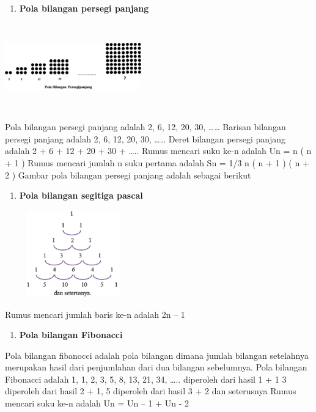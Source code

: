 \documentclass[11pt,fleqn]{book} %
\begin{document}
\noindent
\begin{enumerate}
	\item  \textbf{ Pola bilangan persegi panjang}
\end{enumerate}
\noindent
\begin{center}
	\noindent \includegraphics*[width=2.32in, height=1.48in, keepaspectratio=false, trim=0.00in 0.11in 0.00in 0.00in]{Pictures/25.PNG}
\end{center}
\noindent
\noindent  Pola bilangan persegi panjang adalah 2, 6, 12, 20, 30, ……
\noindent  Barisan bilangan persegi panjang adalah 2, 6, 12, 20, 30, ……
\noindent  Deret bilangan persegi panjang adalah 2 + 6 + 12 + 20 + 30 + …..
\noindent  Rumus mencari suku ke-n adalah Un = n ( n + 1 )
\noindent  Rumus mencari jumlah n suku pertama adalah Sn = 1/3 n ( n + 1 ) ( n + 2 )
\noindent  Gambar pola bilangan persegi panjang adalah sebagai berikut
\noindent
\begin{enumerate}
	\item  \textbf{ Pola bilangan segitiga pascal}
\end{enumerate}
\noindent
\begin{center}
	\noindent \includegraphics*[width=2.32in, height=1.48in, keepaspectratio=false, trim=0.00in 0.11in 0.00in 0.00in]{Pictures/26.PNG}
\end{center}
\noindent
\noindent Rumus mencari jumlah baris ke-n adalah 2n – 1
\noindent 
\noindent
\begin{enumerate}
	\item  \textbf{  Pola bilangan Fibonacci}
\end{enumerate}

\noindent Pola bilangan fibanocci adalah pola bilangan dimana jumlah bilangan setelahnya merupakan hasil dari penjumlahan dari dua bilangan sebelumnya.
\noindent  Pola bilangan Fibonacci adalah 1, 1, 2, 3, 5, 8, 13, 21, 34, …..
 diperoleh dari hasil 1 + 1 3 diperoleh dari hasil 2 + 1, 5 diperoleh dari hasil 3 + 2 dan seterusnya
\noindent  Rumus mencari suku ke-n adalah Un = Un – 1 + Un - 2
\end{document}
